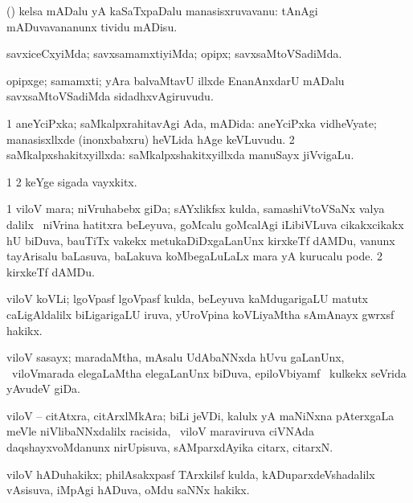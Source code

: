 {{{{{{\noindent
\gl{\pagu}
\bmng
{} (\rUpa) kelsa mADalu yA kaSaTxpaDalu manasisxruvavanu:  tAnAgi mADuvavananunx tividu mADisu. 
\emng
\eentry

\bentry
{}
  \gl{\kirxvi}\bmng
savxiceCxyiMda; savxsamamxtiyiMda; opipx; savxsaMtoVSadiMda. 
\emng
\eentry

\bentry
{}
  \gl{\nA}\bmng
opipxge; samamxti; yAra balvaMtavU illxde EnanAnxdarU mADalu savxsaMtoVSadiMda sidadhxvAgiruvudu. 
\emng
\eentry

\bentry
{} 
\gl{\gu}
\expl{}
\bmng
\bnum
\num{1} aneYciPxka; saMkalpxrahitavAgi Ada, mADida:  aneYciPxka vidheVyate; manasisxllxde (inonxbabxru) heVLida hAge keVLuvudu. 
\num{2} saMkalpxshakitxyillxda:  saMkalpxshakitxyillxda manuSayx jiVvigaLu. 
\enum
\emng
\eentry

\bentry
{} 
\gl{\nA}
\expl{}
\bmng
\bnum
\num{1}  
\num{2} keYge sigada vayxkitx. 
\enum
\emng
\eentry

\bentry
{}
  \gl{\nA}\bmng
\bnum
\num{1} viloV mara; niVruhabebx giDa; sAYxlikfsx kulda, samashiVtoVSaNx valya dalilx \sA\ niVrina hatitxra beLeyuva, goMcalu goMcalAgi iLibiVLuva cikakxcikakx hU biDuva, bauTiTx \mo vakekx metukaDiDxgaLanUnx kirxkeTf dAMDu, \mo vanunx tayArisalu baLasuva, baLakuva koMbegaLuLaLx mara yA kurucalu pode. 
\num{2} kirxkeTf dAMDu. 
\enum
\emng
\eentry

\bentry
{}
 \gl{\nA}\bmng
{viloV koVLi; lgoVpasf lgoVpasf kulda, beLeyuva kaMdugarigaLU matutx caLigAldalilx biLigarigaLU iruva, yUroVpina koVLiyaMtha sAmAnayx gwrxsf hakikx.} 
\emng
\eentry

\bentry
{}
  \gl{\nA}\bmng
viloV sasayx; maradaMtha, mAsalu UdAbaNNxda hUvu gaLanUnx, \kanmu\ viloVmarada elegaLaMtha elegaLanUnx biDuva, epiloVbiyamf \mo\ kulkekx seVrida yAvudeV giDa. 
\emng
\eentry

\bentry
{}
  \gl{\nA}\bmng
viloV -- citAtxra, citArxlMkAra; biLi jeVDi, kalulx yA maNiNxna pAterxgaLa meVle niVlibaNNxdalilx racisida, \sA\ viloV maraviruva ciVNAda daqshayxvoMdanunx nirUpisuva, sAMparxdAyika citarx, citarxN. 
\emng
\eentry

\bentry
{}
  \gl{\nA}\bmng
viloV hADuhakikx; philAsakxpasf TArxkilsf kulda, kADuparxdeVshadalilx vAsisuva, iMpAgi hADuva, oMdu saNNx hakikx. 
\emng
\eentry

}}}}}}
